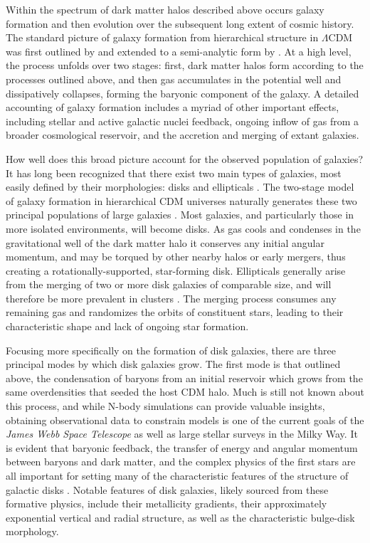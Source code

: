 Within the spectrum of dark matter halos described above occurs galaxy formation and then evolution over the subsequent long extent of cosmic history. The standard picture of galaxy formation from hierarchical structure in $\Lambda$CDM was first outlined by \textcite{white78} and extended to a semi-analytic form by \textcite{white91}. At a high level, the process unfolds over two stages: first, dark matter halos form according to the processes outlined above, and then gas accumulates in the potential well and dissipatively collapses, forming the baryonic component of the galaxy. A detailed accounting of galaxy formation includes a myriad of other important effects, including stellar and active galactic nuclei feedback, ongoing inflow of gas from a broader cosmological reservoir, and the accretion and merging of extant galaxies.

How well does this broad picture account for the observed population of galaxies? It has long been recognized that there exist two main types of galaxies, most easily defined by their morphologies: disks and ellipticals \parencite[e.g. the famous `tuning fork' classification of][]{hubble26}. The two-stage model of galaxy formation in hierarchical CDM universes naturally generates these two principal populations of large galaxies \parencite{fall79,efstathiou83,blumenthal84}. Most galaxies, and particularly those in more isolated environments, will become disks. As gas cools and condenses in the gravitational well of the dark matter halo it conserves any initial angular momentum, and may be torqued by other nearby halos or early mergers, thus creating a rotationally-supported, star-forming disk. Ellipticals generally arise from the merging of two or more disk galaxies of comparable size, and will therefore be more prevalent in clusters \parencite{toomre72,gerhard81,barnes88}. The merging process consumes any remaining gas and randomizes the orbits of constituent stars, leading to their characteristic shape and lack of ongoing star formation.

Focusing more specifically on the formation of disk galaxies, there are three principal modes by which disk galaxies grow. The first mode is that outlined above, the condensation of baryons from an initial reservoir which grows from the same overdensities that seeded the host CDM halo. Much is still not known about this process, and while N-body simulations can provide valuable insights, obtaining observational data to constrain models is one of the current goals of the \textit{James Webb Space Telescope} as well as large stellar surveys in the Milky Way. It is evident that baryonic feedback, the transfer of energy and angular momentum between baryons and dark matter, and the complex physics of the first stars are all important for setting many of the characteristic features of the structure of galactic disks \parencite{vandenbosch01}. Notable features of disk galaxies, likely sourced from these formative physics, include their metallicity gradients, their approximately exponential vertical and radial structure, as well as the characteristic bulge-disk morphology.

